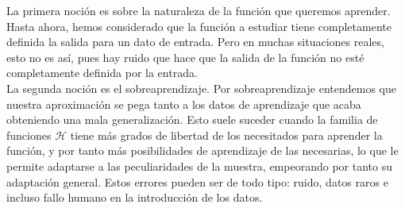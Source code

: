 La primera noción es sobre la naturaleza de la función que queremos aprender. Hasta ahora, hemos considerado que la función a estudiar tiene completamente definida la salida para un dato de entrada. Pero en muchas situaciones reales, esto no es así, pues hay ruido que hace que la salida de la función no esté completamente definida por la entrada.\\ 

La segunda noción es el sobreaprendizaje. Por sobreaprendizaje entendemos que nuestra aproximación se pega tanto a los datos de aprendizaje que acaba obteniendo una mala generalización. Esto suele suceder cuando la familia de funciones $\mathcal{H}$ tiene más grados de libertad de los necesitados para aprender la función, y por tanto más posibilidades de aprendizaje de las necesarias, lo que le permite adaptarse a las peculiaridades de la muestra, empeorando por tanto su adaptación general. Estos errores pueden ser de todo tipo: ruido, datos raros e incluso fallo humano en la introducción de los datos.\\
